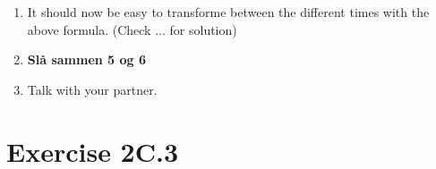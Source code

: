 \documentclass[a4paper,10pt,english]{article}
\begin{document}
\begin{enumerate}
\item It should now be easy to transforme between the different times with the above formula. (Check $\ldots$ for solution)

\item \textbf{Slå sammen 5 og 6}

\item Talk with your partner.
  
\end{enumerate}








\section*{Exercise 2C.3}
\end{document}
